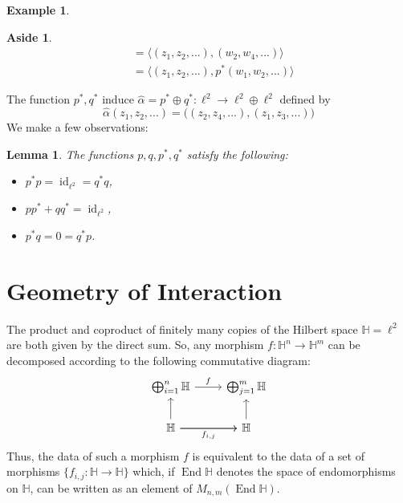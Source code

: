 \documentclass[12pt]{article}
\theoremstyle{plain}
\newtheorem{lemma}[thm]{Lemma}
\theoremstyle{definition}
\newtheorem{example}[thm]{Example}
\newtheorem{aside}[thm]{Aside}
\newcommand{\bb}[1]{\mathbb{#1}}
\newcommand{\lto}{\longrightarrow}
\begin{document}
\begin{example}
\begin{aside}
\begin{align*}
    &= \big\langle (z_1,z_2,...),(w_2,w_4,...)\big\rangle\\
    &= \big\langle (z_1,z_2,...),p^\ast(w_1,w_2,...)\big\rangle
\end{align*}
\end{aside}
The function $p^\ast,q^\ast$ induce $\hat{\alpha} = p^\ast \oplus q^\ast: \ell^2 \lto \ell^2 \oplus \ell^2$ defined by
\begin{equation}
    \hat{\alpha}(z_1,z_2,...) = \big((z_2,z_4,...),(z_1,z_3,...)\big)
\end{equation}
We make a few observations:
\begin{lemma}
The functions $p,q,p^\ast,q^\ast$ satisfy the following:
\begin{itemize}
    \item $p^\ast p = \operatorname{id}_{\ell^2} = q^\ast q$,
    \item $p p^\ast + q q^\ast = \operatorname{id}_{\ell^2}$,
    \item $p^\ast q = 0 = q^\ast p$.
\end{itemize}
\end{lemma}
\end{example}
%
%
%
%
%
%
%
%
%
%
%
%
\section{Geometry of Interaction}
The product and coproduct of finitely many copies of the Hilbert space $\bb{H} = \ell^2$ are both given by the direct sum. So, any morphism $f: \bb{H}^n \lto \bb{H}^m$ can be decomposed according to the following commutative diagram:
\begin{equation}
    \begin{tikzcd}
    \bigoplus_{i = 1}^n\bb{H}\arrow[r,"f"] & \bigoplus_{j = 1}^m\bb{H}\\
    \bb{H}\arrow[u]\arrow[r]\arrow[r,swap,"{f_{i,j}}"] & \bb{H}\arrow[u]
    \end{tikzcd}
\end{equation}
Thus, the data of such a morphism $f$ is equivalent to the data of a set of morphisms $\lbrace f_{i,j}: \bb{H} \lto \bb{H}\rbrace$ which, if $\operatorname{End}\bb{H}$ denotes the space of endomorphisms on $\bb{H}$, can be written as an element of $M_{n,m}(\operatorname{End}\bb{H})$.
\end{document}
